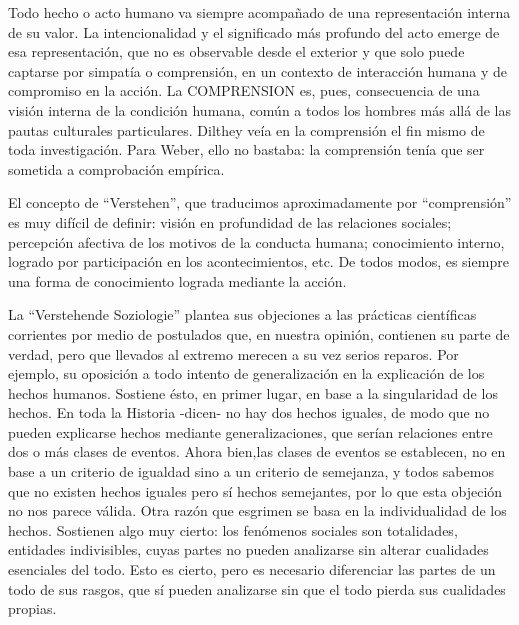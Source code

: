 \documentclass[
]{book}
\begin{document}
Todo hecho o acto humano va siempre acompañado de una representación interna de su valor. La intencionalidad y el significado más profundo del acto emerge de esa representación, que no es observable desde el exterior y que solo puede captarse por simpatía o comprensión, en un contexto de interacción humana y de compromiso en la acción. La COMPRENSION es, pues, consecuencia de una visión interna de la condición humana, común a todos los hombres más allá de las pautas culturales particulares. Dilthey veía en la comprensión el fin mismo de toda investigación. Para Weber, ello no bastaba: la comprensión tenía que ser sometida a comprobación empírica.

El concepto de ``Verstehen'', que traducimos aproximadamente por ``comprensión'' es muy difícil de definir: visión en profundidad de las relaciones sociales; percepción afectiva de los motivos de la conducta humana; conocimiento interno, logrado por participación en los acontecimientos, etc. De todos modos, es siempre una forma de conocimiento lograda mediante la acción.

La ``Verstehende Soziologie'' plantea sus objeciones a las prácticas científicas corrientes por medio de postulados que, en nuestra opinión, contienen su parte de verdad, pero que llevados al extremo merecen a su vez serios reparos. Por ejemplo, su oposición a todo intento de generalización en la explicación de los hechos humanos. Sostiene ésto, en primer lugar, en base a la singularidad de los hechos. En toda la Historia -dicen- no hay dos hechos iguales, de modo que no pueden explicarse hechos mediante generalizaciones, que serían relaciones entre dos o más clases de eventos. Ahora bien,las clases de eventos se establecen, no en base a un criterio de igualdad sino a un criterio de semejanza, y todos sabemos que no existen hechos iguales pero sí hechos semejantes, por lo que esta objeción no nos parece válida. Otra razón que esgrimen se basa en la individualidad de los hechos. Sostienen algo muy cierto: los fenómenos sociales son totalidades, entidades indivisibles, cuyas partes no pueden analizarse sin alterar cualidades esenciales del todo. Esto es cierto, pero es necesario diferenciar las partes de un todo de sus rasgos, que sí pueden analizarse sin que el todo pierda sus cualidades propias.
\end{document}
